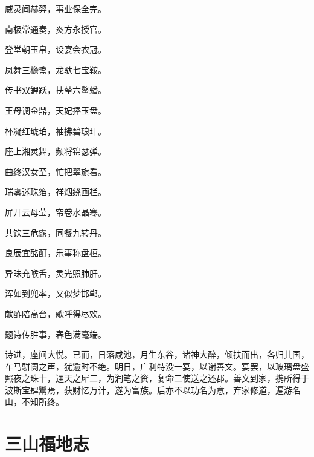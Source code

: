 \documentclass[a4paper,12pt,UTF8,twoside]{ctexbook}
\begin{document}
威灵闻赫羿，事业保全完。

南极常通奏，炎方永授官。

登堂朝玉帛，设宴会衣冠。

凤舞三檐盏，龙驮七宝鞍。

传书双鲤跃，扶辇六鳌蟠。

王母调金鼎，天妃捧玉盘。

杯凝红琥珀，袖拂碧琅玕。

座上湘灵舞，频将锦瑟弹。

曲终汉女至，忙把翠旗看。

瑞雾迷珠箔，祥烟绕画栏。

屏开云母莹，帘卷水晶寒。

共饮三危露，同餐九转丹。

良辰宜酩酊，乐事称盘桓。

异昧充喉舌，灵光照肺肝。

浑如到兜率，又似梦邯郸。

献酢陪高台，歌呼得尽欢。

题诗传胜事，春色满毫端。

诗进，座间大悦。已而，日落咸池，月生东谷，诸神大醉，倾扶而出，各归其国，车马駢阗之声，犹逾时不绝。明日，广利特没一宴，以谢善文。宴罢，以玻璃盘盛照夜之珠十，通天之犀二，为润笔之资，复命二使送之还郡。善文到家，携所得于波斯宝肆鬻焉，获财忆万计，遂为富族。后亦不以功名为意，弃家修道，遍游名山，不知所终。

\chapter{三山福地志}
\end{document}
